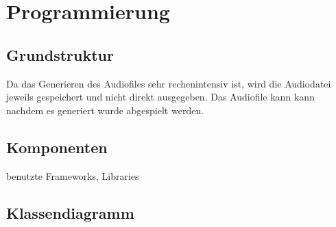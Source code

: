 \chapter{Programmierung}

\section{Grundstruktur}
Da das Generieren des Audiofiles sehr rechenintensiv ist, wird die Audiodatei jeweils gespeichert und nicht direkt ausgegeben. Das Audiofile kann kann nachdem es generiert wurde abgespielt werden.

\section{Komponenten}
benutzte Frameworks, Libraries

\section{Klassendiagramm}



